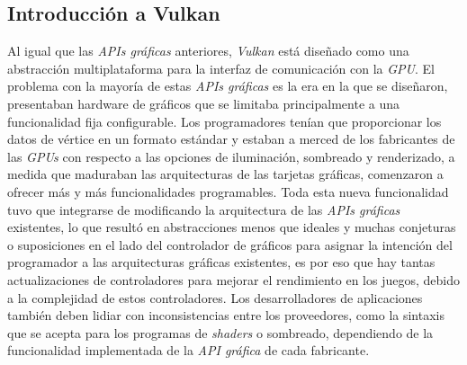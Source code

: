 \documentclass[a4paper]{book}
\begin{document}
\subsection{Introducción a Vulkan}
\label{subsec:IntroVulkan}

Al igual que las \textit{APIs gráficas} anteriores, \textit{Vulkan} está diseñado como una abstracción multiplataforma
para la interfaz de comunicación con la \textit{GPU}. El problema con la mayoría de estas \textit{APIs gráficas} es la era en la que se diseñaron, 
presentaban hardware de gráficos que se limitaba principalmente a una funcionalidad fija configurable. Los programadores tenían que
proporcionar los datos de vértice en un formato estándar y estaban a merced de los fabricantes de las \textit{GPUs} con respecto
a las opciones de iluminación, sombreado y renderizado, a medida que maduraban las arquitecturas de las tarjetas gráficas,
comenzaron a ofrecer más y más funcionalidades programables. Toda esta nueva funcionalidad tuvo que integrarse de modificando la arquitectura
de las \textit{APIs gráficas} existentes, lo que resultó en abstracciones menos que ideales y muchas conjeturas o suposiciones en el lado del
controlador de gráficos para asignar la intención del programador a las arquitecturas gráficas existentes, es por eso que hay tantas actualizaciones
de controladores para mejorar el rendimiento en los juegos, debido a la complejidad de estos controladores. Los desarrolladores de aplicaciones
también deben lidiar con inconsistencias entre los proveedores, como la sintaxis que se acepta para los programas de \textit{shaders} o sombreado, 
dependiendo de la funcionalidad implementada de la \textit{API gráfica} de cada fabricante.
\end{document}

